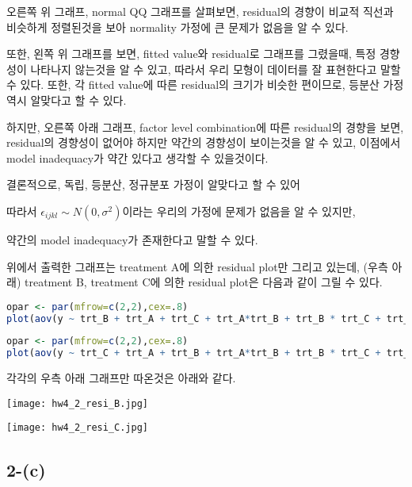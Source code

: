 \documentclass{article}
\begin{document}
오른쪽 위 그래프, normal QQ 그래프를 살펴보면, residual의 경향이 비교적 직선과 비슷하게 정렬된것을 보아 normality 가정에 큰 문제가 없음을 알 수 있다.

또한, 왼쪽 위 그래프를 보면, fitted value와 residual로 그래프를 그렸을때, 특정 경향성이 나타나지 않는것을 알 수 있고, 따라서 우리 모형이 데이터를 잘 표현한다고 말할 수 있다. 또한, 각 fitted value에 따른 residual의 크기가 비슷한 편이므로, 등분산 가정 역시 알맞다고 할 수 있다.


하지만, 오른쪽 아래 그래프, factor level combination에 따른 residual의 경향을 보면, residual의 경향성이 없어야 하지만 약간의 경향성이 보이는것을 알 수 있고, 이점에서 model inadequacy가 약간 있다고 생각할 수 있을것이다. 

결론적으로, 독립, 등분산, 정규분포 가정이 알맞다고 할 수 있어

따라서 $\epsilon_{ijkl} \sim N(0,\sigma^2)$이라는 우리의 가정에 문제가 없음을 알 수 있지만,

약간의 model inadequacy가 존재한다고 말할 수 있다.


위에서 출력한 그래프는 treatment A에 의한 residual plot만 그리고 있는데, (우측 아래)
treatment B, treatment C에 의한 residual plot은 다음과 같이 그릴 수 있다.

\begin{lstlisting}[language=R]
opar <- par(mfrow=c(2,2),cex=.8)
plot(aov(y ~ trt_B + trt_A + trt_C + trt_A*trt_B + trt_B * trt_C + trt_A * trt_C + trt_A * trt_B * trt_C, data = df2))
\end{lstlisting}

\begin{lstlisting}[language=R]
opar <- par(mfrow=c(2,2),cex=.8)
plot(aov(y ~ trt_C + trt_A + trt_B + trt_A*trt_B + trt_B * trt_C + trt_A * trt_C + trt_A * trt_B * trt_C, data = df2))
\end{lstlisting}

각각의 우측 아래 그래프만 따온것은 아래와 같다.

\begin{center}
    \texttt{[image: hw4\_2\_resi\_B.jpg]}
\end{center} 

\begin{center}
    \texttt{[image: hw4\_2\_resi\_C.jpg]}
\end{center} 


\subsection{2-(c)}
\end{document}

